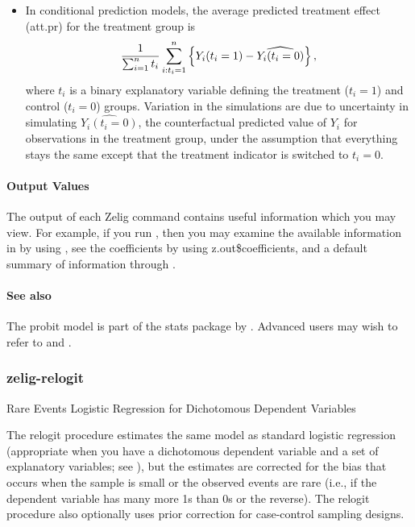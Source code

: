 \documentclass[letterpaper,10pt,english]{sphinxmanual}
\begin{document}
\begin{itemize}
\item {} 
In conditional prediction models, the average predicted treatment
effect (att.pr) for the treatment group is
\begin{gather}
\begin{split}\frac{1}{\sum_{i=1}^n t_i}\sum_{i:t_i=1}^n \left\{ Y_i(t_i=1) -
      \widehat{Y_i(t_i=0)} \right\},\end{split}\notag
\end{gather}
where \(t_i\) is a binary explanatory variable defining the
treatment (\(t_i=1\)) and control (\(t_i=0\)) groups.
Variation in the simulations are due to uncertainty in simulating
\(\widehat{Y_i(t_i=0)}\), the counterfactual predicted value of
\(Y_i\) for observations in the treatment group, under the
assumption that everything stays the same except that the treatment
indicator is switched to \(t_i=0\).

\end{itemize}


\paragraph{Output Values}
\label{zelig-probit:output-values}
The output of each Zelig command contains useful information which you
may view. For example, if you run
, then you may examine
the available information in  by using , see
the coefficients by using z.out\$coefficients, and a default summary of
information through .


\paragraph{See also}
\label{zelig-probit:see-also}
The probit model is part of the stats package by . Advanced users may
wish to refer to  and .


\subsubsection{zelig-relogit}
\label{zelig-relogit:zrelogit}\label{zelig-relogit::doc}\label{zelig-relogit:zelig-relogit}
Rare Events Logistic Regression for Dichotomous Dependent Variables

The relogit procedure estimates the same model as standard logistic
regression (appropriate when you have a dichotomous dependent variable
and a set of explanatory variables; see ), but the estimates are
corrected for the bias that occurs when the sample is small or the
observed events are rare (i.e., if the dependent variable has many more
1s than 0s or the reverse). The relogit procedure also optionally uses
prior correction for case-control sampling designs.
\end{document}
